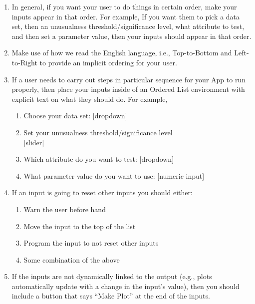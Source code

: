 \documentclass[
]{book}
\providecommand{\tightlist}{%
  \setlength{\itemsep}{0pt}\setlength{\parskip}{0pt}}
\begin{document}
\begin{enumerate}
\def\labelenumi{\arabic{enumi}.}
\tightlist
\item
  In general, if you want your user to do things in certain order, make your inputs appear in that order. For example, If you want them to pick a data set, then an unusualness threshold/significance level, what attribute to test, and then set a parameter value, then your inputs should appear in that order.
\item
  Make use of how we read the English language, i.e., Top-to-Bottom and Left-to-Right to provide an implicit ordering for your user.
\item
  If a user needs to carry out steps in particular sequence for your App to run properly, then place your inputs inside of an Ordered List environment with explicit text on what they should do. For example,

  \begin{enumerate}
  \def\labelenumii{\arabic{enumii}.}
  \tightlist
  \item
    Choose your data set: {[}dropdown{]}\\
  \item
    Set your unusualness threshold/significance level\\
    {[}slider{]}\\
  \item
    Which attribute do you want to test: {[}dropdown{]}\\
  \item
    What parameter value do you want to use: {[}numeric input{]}
  \end{enumerate}
\item
  If an input is going to reset other inputs you should either:

  \begin{enumerate}
  \def\labelenumii{\alph{enumii}.}
  \tightlist
  \item
    Warn the user before hand\\
  \item
    Move the input to the top of the list\\
  \item
    Program the input to not reset other inputs\\
  \item
    Some combination of the above\\
  \end{enumerate}
\item
  If the inputs are not dynamically linked to the output (e.g., plots automatically update with a change in the input's value), then you should include a button that says ``Make Plot'' at the end of the inputs.
\end{enumerate}
\end{document}
